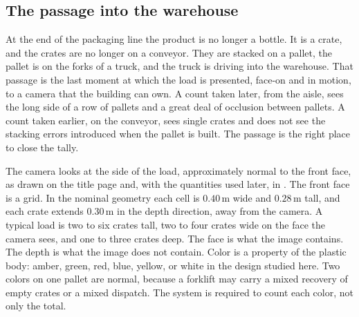 \subsection{The passage into the warehouse}
\label{sec:scene-geom}

At the end of the packaging line the product is no longer a bottle. It is a crate, and the crates are no longer on a conveyor. They are stacked on a pallet, the pallet is on the forks of a truck, and the truck is driving into the warehouse. That passage is the last moment at which the load is presented, face-on and in motion, to a camera that the building can own. A count taken later, from the aisle, sees the long side of a row of pallets and a great deal of occlusion between pallets. A count taken earlier, on the conveyor, sees single crates and does not see the stacking errors introduced when the pallet is built. The passage is the right place to close the tally.

The camera looks at the side of the load, approximately normal to the front face, as drawn on the title page and, with the quantities used later, in . The front face is a grid. In the nominal geometry each cell is $0.40\,\mathrm{m}$ wide and $0.28\,\mathrm{m}$ tall, and each crate extends $0.30\,\mathrm{m}$ in the depth direction, away from the camera. A typical load is two to six crates tall, two to four crates wide on the face the camera sees, and one to three crates deep. The face is what the image contains. The depth is what the image does not contain. Color is a property of the plastic body: amber, green, red, blue, yellow, or white in the design studied here. Two colors on one pallet are normal, because a forklift may carry a mixed recovery of empty crates or a mixed dispatch. The system is required to count each color, not only the total.

